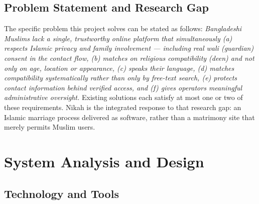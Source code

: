 \documentclass[12pt,a4paper]{report}
\begin{document}
\section{Problem Statement and Research Gap}
The specific problem this project solves can be stated as follows:
\emph{Bangladeshi Muslims lack a single, trustworthy online platform that
simultaneously (a) respects Islamic privacy and family involvement --- including
real \emph{wali} (guardian) consent in the contact flow, (b) matches on
religious compatibility (\emph{deen}) and not only on age, location or
appearance, (c) speaks their language, (d) matches compatibility systematically
rather than only by free-text search, (e) protects contact information behind
verified access, and (f) gives operators meaningful administrative oversight.}
Existing solutions each satisfy at most one or two of these requirements.
Nikah is the integrated response to that research gap: an Islamic marriage
process delivered as software, rather than a matrimony site that merely permits
Muslim users.

\chapter{System Analysis and Design}

\section{Technology and Tools}
\end{document}
